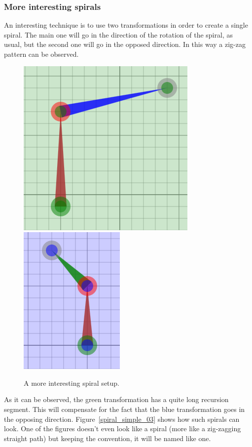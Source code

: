             \FloatBarrier

        \subsubsection{More interesting spirals}

            An interesting technique is to use two transformations in order to create a single spiral.
            The main one will go in the direction of the rotation of the spiral, as usual, but the second one will go in the opposed direction.
            In this way a zig-zag pattern can be observed.

            \begin{figure}[ht]
                \caption{\label{spiral_simple_02} A more interesting spiral setup.}
                \centering
                \includegraphics[height=0.3\textwidth]{img/Simple_Techniques/Spirals/spiral_set_02_01.png}
                \includegraphics[height=0.3\textwidth]{img/Simple_Techniques/Spirals/spiral_set_02_02.png}
            \end{figure}

            \FloatBarrier

            As it can be observed, the green transformation has a quite long recursion segment.
            This will compensate for the fact that the blue transformation goes in the opposing direction.
            Figure~\ref{spiral_simple_03} shows how such spirals can look.
            One of the figures doesn't even look like a spiral (more like a zig-zagging straight path) but keeping the convention, it will be named like one.

